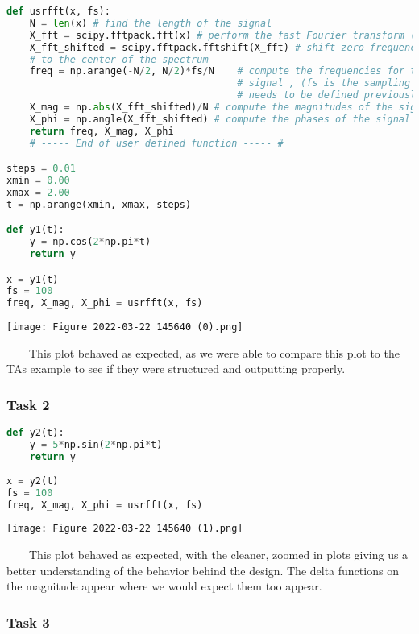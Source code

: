 \documentclass[11pt,a4]{article}
\begin{document}
\begin{lstlisting}[language=Python]
def usrfft(x, fs):
    N = len(x) # find the length of the signal
    X_fft = scipy.fftpack.fft(x) # perform the fast Fourier transform (fft)
    X_fft_shifted = scipy.fftpack.fftshift(X_fft) # shift zero frequency components
    # to the center of the spectrum
    freq = np.arange(-N/2, N/2)*fs/N    # compute the frequencies for the output
                                        # signal , (fs is the sampling frequency and
                                        # needs to be defined previously in your code
    X_mag = np.abs(X_fft_shifted)/N # compute the magnitudes of the signal
    X_phi = np.angle(X_fft_shifted) # compute the phases of the signal
    return freq, X_mag, X_phi
    # ----- End of user defined function ----- #

steps = 0.01
xmin = 0.00
xmax = 2.00
t = np.arange(xmin, xmax, steps)

def y1(t):
    y = np.cos(2*np.pi*t)
    return y

x = y1(t)
fs = 100
freq, X_mag, X_phi = usrfft(x, fs)
\end{lstlisting}

\texttt{[image: Figure 2022-03-22 145640 (0).png]}

\ \ \ \ This plot behaved as expected, as we were able to compare this plot to the TAs example to see if they were structured and outputting properly.

\subsubsection{Task 2}

\begin{lstlisting}[language=Python]
def y2(t):
    y = 5*np.sin(2*np.pi*t)
    return y
    
x = y2(t)
fs = 100
freq, X_mag, X_phi = usrfft(x, fs)
\end{lstlisting}

\texttt{[image: Figure 2022-03-22 145640 (1).png]}

\ \ \ \ This plot behaved as expected, with the cleaner, zoomed in plots giving us a better understanding of the behavior behind the design. The delta functions on the magnitude appear where we would expect them too appear.

\subsubsection{Task 3}
\end{document}
